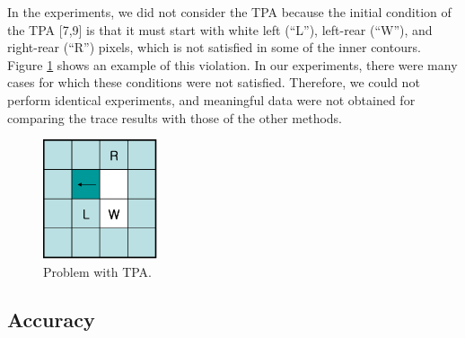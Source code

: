 
In the experiments, we did not consider the TPA because the initial condition of the TPA [7,9] is that it must start with white left (``L''), left-rear (``W''), and right-rear (``R'') pixels, which is not satisfied in some of the inner contours. Figure \ref{fig:image15} shows an example of this violation. In our experiments, there were many cases for which these conditions were not satisfied. Therefore, we could not perform identical experiments, and meaningful data were not obtained for comparing the trace results with those of the other methods. 

\begin{figure}[htbp]
	\centering
	\includegraphics[width=0.3\textwidth]{5.ExperimentalResult/fig15.png}
	\caption{Problem with TPA.}
	\label{fig:image15}
\end{figure}

\subsection{Accuracy}


